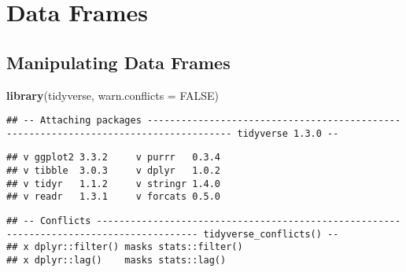 \documentclass[
]{book}
\newenvironment{Shaded}{\begin{snugshade}}{\end{snugshade}}
\newcommand{\DataTypeTok}[1]{\textcolor[rgb]{0.13,0.29,0.53}{#1}}
\newcommand{\KeywordTok}[1]{\textcolor[rgb]{0.13,0.29,0.53}{\textbf{#1}}}
\newcommand{\NormalTok}[1]{#1}
\newcommand{\OtherTok}[1]{\textcolor[rgb]{0.56,0.35,0.01}{#1}}
\begin{document}
\cleardoublepage

\hypertarget{part-data-frames}{%
\part{Data Frames}\label{part-data-frames}}

\hypertarget{manipulating-data-frames}{%
\chapter{Manipulating Data Frames}\label{manipulating-data-frames}}

\begin{Shaded}
\begin{Highlighting}[]
\KeywordTok{library}\NormalTok{(tidyverse, }\DataTypeTok{warn.conflicts =} \OtherTok{FALSE}\NormalTok{)}
\end{Highlighting}
\end{Shaded}

\begin{verbatim}
## -- Attaching packages ------------------------------------------------------------------------------------- tidyverse 1.3.0 --
\end{verbatim}

\begin{verbatim}
## v ggplot2 3.3.2     v purrr   0.3.4
## v tibble  3.0.3     v dplyr   1.0.2
## v tidyr   1.1.2     v stringr 1.4.0
## v readr   1.3.1     v forcats 0.5.0
\end{verbatim}

\begin{verbatim}
## -- Conflicts ---------------------------------------------------------------------------------------- tidyverse_conflicts() --
## x dplyr::filter() masks stats::filter()
## x dplyr::lag()    masks stats::lag()
\end{verbatim}
\end{document}
